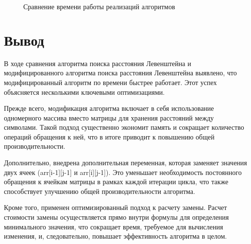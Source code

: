 \begin{figure}[ht!]
	\begin{center}
		\captionsetup{singlelinecheck = false, justification=centerfirst}
		\centering
		\caption{Сравнение времени работы реализаций алгоритмов}
		\label{fig:graph1}
	\end{center}
\end{figure}
\clearpage

\section*{Вывод}

В ходе сравнения алгоритма поиска расстояния Левенштейна и модифицированного алгоритма поиска расстояния Левенштейна выявлено, что модифицированный алгоритм по времени быстрее работает. 
Этот успех объясняется несколькими ключевыми оптимизациями.

Прежде всего, модификация алгоритма включает в себя использование одномерного массива вместо матрицы для хранения расстояний между символами. 
Такой подход существенно экономит память и сокращает количество операций обращения к ней, что в итоге приводит к повышению общей производительности.

Дополнительно, внедрена дополнительная переменная, которая заменяет значения двух ячеек (arr[i-1][j-1] и arr[i][j-1]). 
Это уменьшает необходимость постоянного обращения к ячейкам матрицы в рамках каждой итерации цикла, что также способствует улучшению общей производительности алгоритма.

Кроме того, применен оптимизированный подход к расчету замены. 
Расчет стоимости замены осуществляется прямо внутри формулы для определения минимального значения, что сокращает время, требуемое для вычисления изменения, и, следовательно, повышает эффективность алгоритма в целом.